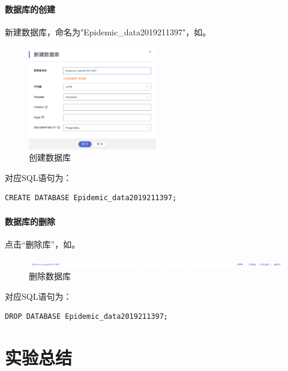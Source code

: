 \documentclass[lang=cn,11pt,a4paper,cite=authornum]{paper}
\begin{document}
\paragraph{数据库的创建}

新建数据库，命名为"Epidemic\_data2019211397"，如。
\begin{figure}[!htb]
    \centering
    \includegraphics[width=0.5\textwidth]{./images/create_db.png}
    \caption{创建数据库\label{fig:create_db}}
\end{figure}

对应SQL语句为：

\begin{code}
\begin{verbatim}
CREATE DATABASE Epidemic_data2019211397;
\end{verbatim}
\end{code}

\paragraph{数据库的删除}

点击“删除库”，如。
\begin{figure}[!htb]
    \centering
    \includegraphics[width=\textwidth]{./images/delete_db.png}
    \caption{删除数据库\label{fig:delete_db}}
\end{figure}

对应SQL语句为：

\begin{code}
\begin{verbatim}
DROP DATABASE Epidemic_data2019211397;
\end{verbatim}
\end{code}

\section{实验总结}
\end{document}
